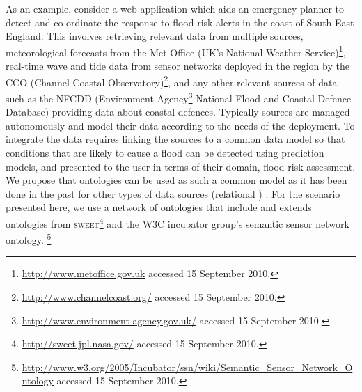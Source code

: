 As an example, consider a web application which aids an emergency planner to detect and co-ordinate the response to flood risk alerts in the coast of South East England. 
This involves retrieving relevant data from multiple sources, \eg meteorological forecasts from the Met Office (UK's National Weather Service)\footnote{\url{http://www.metoffice.gov.uk} accessed 15 September 2010.}, real-time wave and tide data from sensor networks deployed in the region by the \textsc{CCO} (Channel Coastal Observatory)\footnote{\url{http://www.channelcoast.org/} accessed 15 September 2010.}, and any other relevant sources of data such as the \textsc{NFCDD} (Environment Agency\footnote{\url{http://www.environment-agency.gov.uk/} accessed 15 September 2010.} National Flood and Coastal Defence Database)  providing
data about coastal defences. 
Typically sources are managed autonomously and model their data according to the needs of the deployment. 
To integrate the data requires linking the sources to a common data model so that conditions that are likely to cause a flood can be detected using prediction models, and presented to the user in terms of their domain, \eg flood risk assessment. \\


We propose that ontologies can be used as such a common model as it has been done in the past for other types of data sources (\eg relational \cite{Wache_01}) . 
For the scenario presented here, we use a network of ontologies that include and extends ontologies from \textsc{sweet}\footnote{\url{http://sweet.jpl.nasa.gov/} accessed 15 September 2010.} and the W3C incubator group's semantic sensor network ontology.
\footnote{\url{http://www.w3.org/2005/Incubator/ssn/wiki/Semantic_Sensor_Network_Ontology} accessed 15 September 2010.}

